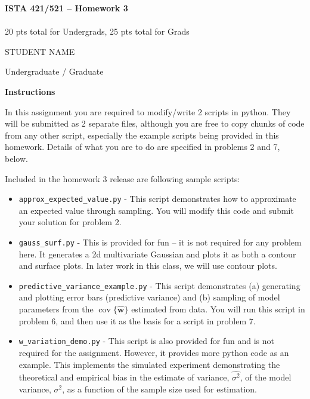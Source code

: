 \documentclass[10pt]{article}
\DeclareMathOperator{\cov}{cov}
\begin{document}
\begin{center}
    {\Large {\bf ISTA 421/521 -- Homework 3}} \\
     \\
    20 pts total for Undergrads, 25 pts total for Grads
\end{center}

\begin{flushright}
STUDENT NAME %

Undergraduate / Graduate %
\end{flushright}

\vspace{1cm}
{\Large {\bf Instructions}}

In this assignment you are required to modify/write 2 scripts in python.  They will be submitted as 2 separate files, although you are free to copy chunks of code from any other script, especially the example scripts being provided in this homework.  Details of what you are to do are specified in problems 2 and 7, below.

Included in the homework 3 release are following sample scripts:
\begin{itemize}
\item {\tt approx\_expected\_value.py} - This script demonstrates how to approximate an expected value through sampling.  You will modify this code and submit your solution for problem 2.
\item {\tt gauss\_surf.py} - This is provided for fun -- it is not required for any problem here.  It generates a 2d multivariate Gaussian and plots it as both a contour and surface plots.  In later work in this class, we will use contour plots.
\item {\tt predictive\_variance\_example.py} - This script demonstrates (a) generating and plotting error bars (predictive variance) and (b) sampling of model parameters from the $\cov\{\widehat{\mathbf{w}}\}$ estimated from data.  You will run this script in problem 6, and then use it as the basis for a script in problem 7.
\item {\tt w\_variation\_demo.py} - This script is also provided for fun and is not required for the assignment.  However, it provides more python code as an example.  This implements the simulated experiment demonstrating the theoretical and empirical bias in the estimate of variance, $\widehat{\sigma^2}$, of the model variance, $\sigma^2$, as a function of the sample size used for estimation.
\end{itemize}
\end{document}
